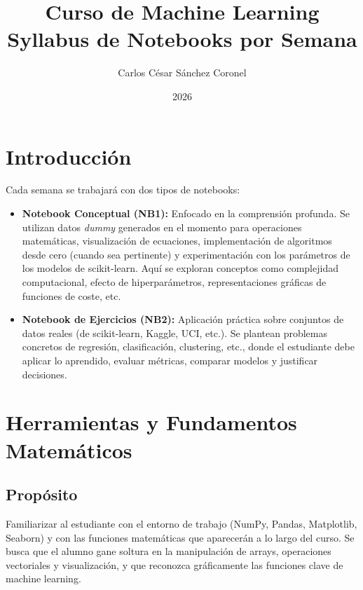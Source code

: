 \documentclass[12pt,a4paper]{article}
\title{\textbf{Curso de Machine Learning}\\ \large Syllabus de Notebooks por Semana}
\author{Carlos César Sánchez Coronel}
\date{2026}
\begin{document}
\maketitle

\section*{Introducción}
Cada semana se trabajará con dos tipos de notebooks:
\begin{itemize}[leftmargin=*]
    \item \textbf{Notebook Conceptual (NB1):} Enfocado en la comprensión profunda. Se utilizan datos \textit{dummy} generados en el momento para operaciones matemáticas, visualización de ecuaciones, implementación de algoritmos desde cero (cuando sea pertinente) y experimentación con los parámetros de los modelos de scikit-learn. Aquí se exploran conceptos como complejidad computacional, efecto de hiperparámetros, representaciones gráficas de funciones de coste, etc.
    \item \textbf{Notebook de Ejercicios (NB2):} Aplicación práctica sobre conjuntos de datos reales (de scikit-learn, Kaggle, UCI, etc.). Se plantean problemas concretos de regresión, clasificación, clustering, etc., donde el estudiante debe aplicar lo aprendido, evaluar métricas, comparar modelos y justificar decisiones.
\end{itemize}

\newpage

\section{Herramientas y Fundamentos Matemáticos}
\subsection*{Propósito}
Familiarizar al estudiante con el entorno de trabajo (NumPy, Pandas, Matplotlib, Seaborn) y con las funciones matemáticas que aparecerán a lo largo del curso. Se busca que el alumno gane soltura en la manipulación de arrays, operaciones vectoriales y visualización, y que reconozca gráficamente las funciones clave de machine learning.
\end{document}
